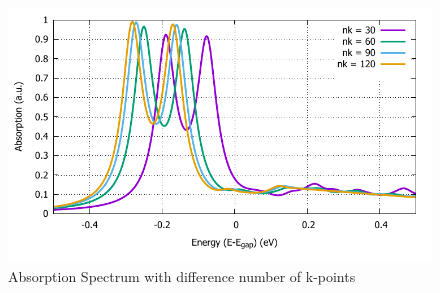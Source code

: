 \documentclass[12pt,english,a4paper]{article}
\begin{document}
\begin{figure}
	\begin{center}
		\includegraphics[width=0.75\linewidth]{images/varynk.pdf}
		\caption[Absorption Spectrum with difference number of k-points]{Absorption Spectrum with difference number of k-points}
		\label{Vary nk}
	\end{center}
\end{figure}\null
\newpage
\end{document}
